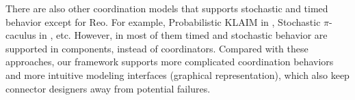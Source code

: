 

\vspace{0.2cm}

    There are also other coordination models that supports stochastic and timed behavior except for Reo. For example, Probabilistic KLAIM in \cite{Pierro2004}, Stochastic $\pi$-caculus in \cite{Priami95}, etc. However, in most of them timed and stochastic behavior are supported in components, instead of coordinators. Compared with these approaches, our framework supports more complicated coordination behaviors and more intuitive modeling interfaces (graphical representation), which also keep connector designers away from potential failures.

